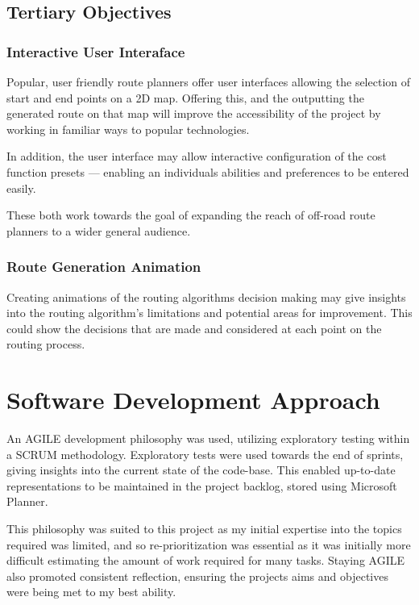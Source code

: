 \documentclass[12pt]{article}
\begin{document}
\subsection{Tertiary Objectives}

\subsubsection{Interactive User Interaface}

Popular, user friendly route planners offer user interfaces allowing the selection of start and end points on a 2D map. Offering this, and the outputting the generated route on that map will improve the accessibility of the project by working in familiar ways to popular technologies.

In addition, the user interface may allow interactive configuration of the cost function presets --- enabling an individuals abilities and preferences to be entered easily.

These both work towards the goal of expanding the reach of off-road route planners to a wider general audience.

\subsubsection{Route Generation Animation}

Creating animations of the routing algorithms decision making may give insights into the routing algorithm's limitations and potential areas for improvement. This could show the decisions that are made and considered at each point on the routing process.

\section{Software Development Approach}

An AGILE development philosophy was used, utilizing exploratory testing within a SCRUM methodology. Exploratory tests were used towards the end of sprints, giving insights into the current state of the code-base. This enabled up-to-date representations to be maintained in the project backlog, stored using Microsoft Planner.

This philosophy was suited to this project as my initial expertise into the topics required was limited, and so re-prioritization was essential as it was initially more difficult estimating the amount of work required for many tasks. Staying AGILE also promoted consistent reflection, ensuring the projects aims and objectives were being met to my best ability.
\end{document}
